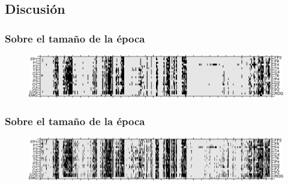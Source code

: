 \documentclass[serif,mathserif,professionalfont]{beamer}
\begin{document}

\subsection{Discusi\'on}

%
%


\begin{frame}\frametitle{Sobre el tama\~no de la \'epoca}
\begin{figure}
\centering
\includegraphics[width=0.9\linewidth]
{./img_ejemplos/VCNNS1_est_60.png} 
\end{figure}
\end{frame}


\begin{frame}\frametitle{Sobre el tama\~no de la \'epoca}
\begin{figure}
\centering
\includegraphics[width=0.9\linewidth]
{./img_ejemplos/VCNNS1_est_30.png} 
\end{figure}
\end{frame}
\end{document}
